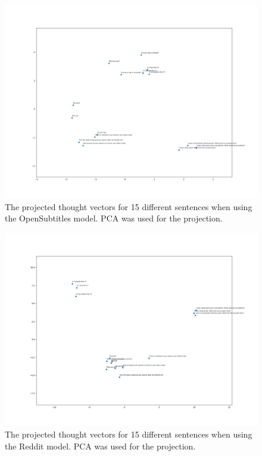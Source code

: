 \begin{figure}[H]
	\centering
	\includegraphics[width=16cm]{img/opensubtitles_thought_vector_embeddings.png}
	\caption{The projected thought vectors for 15 different sentences when using the OpenSubtitles model. PCA was used for the projection.}
	\label{results:thougth_vectors:embeddings:opensubtitles}
\end{figure}

\begin{figure}[H]
	\centering
	\includegraphics[width=16cm]{img/reddit_thought_vector_embeddings.png}
	\caption{The projected thought vectors for 15 different sentences when using the Reddit model. PCA was used for the projection.}
	\label{results:thougth_vectors:embeddings:reddit}
\end{figure}

